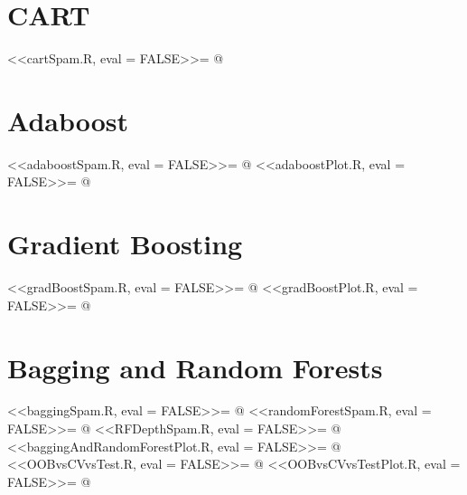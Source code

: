 \section{CART}
<<cartSpam.R, eval = FALSE>>=
@

\section{Adaboost}
<<adaboostSpam.R, eval = FALSE>>=
@
<<adaboostPlot.R, eval = FALSE>>=
@

\section{Gradient Boosting}
<<gradBoostSpam.R, eval = FALSE>>=
@
<<gradBoostPlot.R, eval = FALSE>>=
@

\section{Bagging and Random Forests}
<<baggingSpam.R, eval = FALSE>>=
@
<<randomForestSpam.R, eval = FALSE>>=
@
<<RFDepthSpam.R, eval = FALSE>>=
@
<<baggingAndRandomForestPlot.R, eval = FALSE>>=
@
<<OOBvsCVvsTest.R, eval = FALSE>>=
@
<<OOBvsCVvsTestPlot.R, eval = FALSE>>=
@

